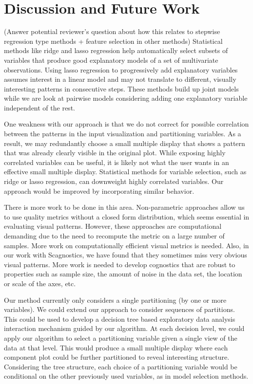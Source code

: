\section{Discussion and Future Work}
\label{sec:discussion}
(Answer potential reviewer's question about how this relates to stepwise regression type methods + feature selection in other methods)
Statistical methods like ridge and lasso regression help automatically select subsets of variables that produce good explanatory models of a set of multivariate observations. Using lasso regression to progressively add explanatory variables assumes interest in a linear model and may not translate to different, visually interesting  patterns in consecutive steps. These methods build up joint models while we are look at pairwise models considering adding one explanatory variable independent of the rest. 

One weakness with our approach is that we do not correct for possible correlation between the patterns in the input visualization and partitioning variables. As a result, we may redundantly choose a small multiple display that shows a pattern that was already clearly visible in the original plot. While exposing highly correlated variables can be useful, it is likely not what the user wants in an effective small multiple display. Statistical methods for variable selection, such as ridge or lasso regression, can downweight highly correlated variables. Our approach would be improved by incorporating similar behavior. 

There is more work to be done in this area. Non-parametric approaches allow us to use quality metrics without a closed form distribution, which seems essential in evaluating visual patterns. However, these approaches are computational demanding due to the need to recompute the metric on a large number of samples. More work on computationally efficient visual metrics is needed. Also, in our work with Scagnostics, we have found that they sometimes miss very obvious visual patterns. More work is needed to develop cognostics that are robust to properties such as sample size, the amount of noise in the data set, the location or scale of the axes, etc. 

Our method currently only considers a single partitioning (by one or more variables). We could extend our approach to consider sequences of partitions. This could be used to develop a decision tree based exploratory data analysis interaction mechanism guided by our algorithm. At each decision level, we could apply our algorithm to select a partitioning variable given a single view of the data at that level. This would produce a small multiple display where each component plot could be further partitioned to reveal interesting structure. Considering the tree structure, each choice of a partitioning variable would be conditional on the other previously used variables, as in model selection methods. 


